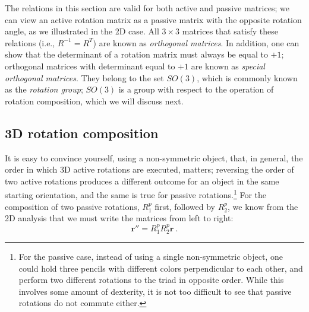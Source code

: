 The relations in this section are valid for both active and passive matrices; we can view an active rotation matrix as a passive matrix with the opposite rotation angle, as we illustrated in the 2D case.  All $3\times 3$ matrices that satisfy these relations (i.e., $R^{-1}=R^T$) are known as \textit{orthogonal matrices}.  In addition, one can show that the determinant of a rotation matrix must always be equal to $+1$; orthogonal matrices with determinant equal to $+1$ are known as \textit{special orthogonal matrices}.  They belong to the set $SO(3)$, which is commonly known as the \textit{rotation group};  $SO(3)$ is a group with respect to the operation of rotation composition, which we will discuss next.

\subsection{3D rotation composition}
It is easy to convince yourself, using a non-symmetric object, that, in general, the order in which 3D active rotations are executed, matters; reversing the order of two active rotations produces a different outcome for an object in the same starting orientation, and the same is true for passive rotations.\footnote{For the passive case, instead of using a single non-symmetric object, one could hold three pencils with different colors perpendicular to each other, and perform two different rotations to the triad in opposite order.  While this involves some amount of dexterity, it is not too difficult to see that passive rotations do not commute either.} For the composition of two passive rotations, $R^p_1$ first, followed by $R^p_2$, we know from the 2D analysis that we must write the matrices from left to right:
\begin{equation}
	\mathbf{r}'' = R^p_1 R^p_2\mathbf{r}\ .
\end{equation}

